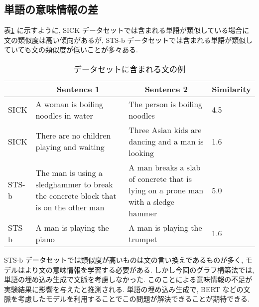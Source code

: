 \documentclass[a4j,twoside,12pt]{thesis} %
\begin{document}
\subsection{単語の意味情報の差}
表\ref{table:SICKSTS} に示すように, SICK データセットでは含まれる単語が類似している場合に文の類似度は高い傾向があるが, STS-b データセットでは含まれる単語が類似していても文の類似度が低いことが多々ある.
\begin{table}
  \caption{データセットに含まれる文の例}
  \label{table:SICKSTS}
  \begin{center}
  \begin{tabularx}{\linewidth}{l||X|X|X}
    \hline
          & \multicolumn{1}{c|}{Sentence 1} & \multicolumn{1}{c|}{Sentence 2} & \multicolumn{1}{c}{Similarity}  \\
    \hline
    \hline
    SICK &
    A woman is boiling noodles in water &
    The person is boiling noodles &
    4.5\\
    \hline
    SICK &
    There are no children playing and waiting &
    Three Asian kids are dancing and a man is looking &
    1.6\\
    \hline
    STS-b &
    The man is using a sledghammer to break the concrete block that is on the other man &
    A man breaks a slab of concrete that is lying on a prone man with a sledge hammer &
    5.0 \\
    \hline
    STS-b &
    A man is playing the piano &
    A man is playing the trumpet &
    1.6\\
    \hline
  \end{tabularx}
  \end{center}
\end{table}

STS-b データセットでは類似度が高いものは文の言い換えであるものが多く, モデルはより文の意味情報を学習する必要がある. しかし今回のグラフ構築法では, 単語の埋め込み生成で文脈を考慮しなかった. このことによる意味情報の不足が実験結果に影響を与えたと推測される. 単語の埋め込み生成で, BERT などの文脈を考慮したモデルを利用することでこの問題が解決できることが期待できる.
\end{document}
